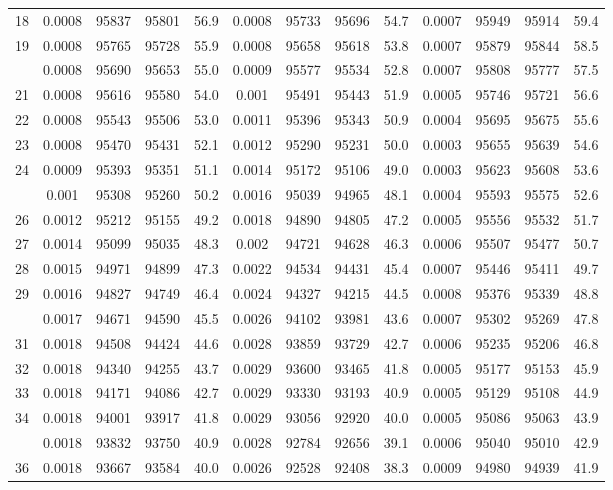 \documentclass[
  14pt,
]{article}
\begin{document}
\begin{longtable}[t]{lcccccccccccc}
18 & 0.0008 & 95837 & 95801 & 56.9 & 0.0008 & 95733 & 95696 & 54.7 & 0.0007 & 95949 & 95914 & 59.4\\
19 & 0.0008 & 95765 & 95728 & 55.9 & 0.0008 & 95658 & 95618 & 53.8 & 0.0007 & 95879 & 95844 & 58.5\\
\addlinespace
20 & 0.0008 & 95690 & 95653 & 55.0 & 0.0009 & 95577 & 95534 & 52.8 & 0.0007 & 95808 & 95777 & 57.5\\
21 & 0.0008 & 95616 & 95580 & 54.0 & 0.001 & 95491 & 95443 & 51.9 & 0.0005 & 95746 & 95721 & 56.6\\
22 & 0.0008 & 95543 & 95506 & 53.0 & 0.0011 & 95396 & 95343 & 50.9 & 0.0004 & 95695 & 95675 & 55.6\\
23 & 0.0008 & 95470 & 95431 & 52.1 & 0.0012 & 95290 & 95231 & 50.0 & 0.0003 & 95655 & 95639 & 54.6\\
24 & 0.0009 & 95393 & 95351 & 51.1 & 0.0014 & 95172 & 95106 & 49.0 & 0.0003 & 95623 & 95608 & 53.6\\
\addlinespace
25 & 0.001 & 95308 & 95260 & 50.2 & 0.0016 & 95039 & 94965 & 48.1 & 0.0004 & 95593 & 95575 & 52.6\\
26 & 0.0012 & 95212 & 95155 & 49.2 & 0.0018 & 94890 & 94805 & 47.2 & 0.0005 & 95556 & 95532 & 51.7\\
27 & 0.0014 & 95099 & 95035 & 48.3 & 0.002 & 94721 & 94628 & 46.3 & 0.0006 & 95507 & 95477 & 50.7\\
28 & 0.0015 & 94971 & 94899 & 47.3 & 0.0022 & 94534 & 94431 & 45.4 & 0.0007 & 95446 & 95411 & 49.7\\
29 & 0.0016 & 94827 & 94749 & 46.4 & 0.0024 & 94327 & 94215 & 44.5 & 0.0008 & 95376 & 95339 & 48.8\\
\addlinespace
30 & 0.0017 & 94671 & 94590 & 45.5 & 0.0026 & 94102 & 93981 & 43.6 & 0.0007 & 95302 & 95269 & 47.8\\
31 & 0.0018 & 94508 & 94424 & 44.6 & 0.0028 & 93859 & 93729 & 42.7 & 0.0006 & 95235 & 95206 & 46.8\\
32 & 0.0018 & 94340 & 94255 & 43.7 & 0.0029 & 93600 & 93465 & 41.8 & 0.0005 & 95177 & 95153 & 45.9\\
33 & 0.0018 & 94171 & 94086 & 42.7 & 0.0029 & 93330 & 93193 & 40.9 & 0.0005 & 95129 & 95108 & 44.9\\
34 & 0.0018 & 94001 & 93917 & 41.8 & 0.0029 & 93056 & 92920 & 40.0 & 0.0005 & 95086 & 95063 & 43.9\\
\addlinespace
35 & 0.0018 & 93832 & 93750 & 40.9 & 0.0028 & 92784 & 92656 & 39.1 & 0.0006 & 95040 & 95010 & 42.9\\
36 & 0.0018 & 93667 & 93584 & 40.0 & 0.0026 & 92528 & 92408 & 38.3 & 0.0009 & 94980 & 94939 & 41.9\\

\end{longtable}
\end{document}

